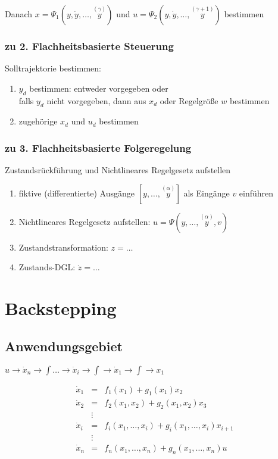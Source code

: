 \documentclass[6pt,a4paper,fleqn]{scrartcl}
\newcommand{\os}[2]{\ensuremath{\overset{#1}{#2}}}
\begin{document}
\begin{multicols*}{4}
Danach $x = \Psi_1 (y, \dot{y}, \dots, \os{(\gamma)}{y})$ und $u = \Psi_2 (y, \dot{y}, \dots, \os{(\gamma +1)}{y})$ bestimmen

\subsubsection*{zu 2. Flachheitsbasierte Steuerung}

Solltrajektorie bestimmen:
\begin{enumerate}
  \item $y_d$ bestimmen: entweder vorgegeben oder\\
    falls $y_d$ nicht vorgegeben, dann aus $x_d$ oder Regelgröße $w$ bestimmen
  \item zugehörige $x_d$ und $u_d$ bestimmen
\end{enumerate}

\subsubsection*{zu 3. Flachheitsbasierte Folgeregelung}
Zustandsrückführung und Nichtlineares Regelgesetz aufstellen
\begin{enumerate}
  \item fiktive (differentierte) Ausgänge $\left[ y, \dots, \os{(\alpha)}{y} \right]$ als Eingänge $v$ einführen
  \item Nichtlineares Regelgesetz aufstellen: $u = \Psi\left( y, \dots, \os{(\alpha)}{y}, v \right)$
  \item Zustandstransformation: $z = \dots$
  \item Zustands-DGL: $\dot{z} = \dots$
\end{enumerate}


\section{Backstepping}

\subsection{Anwendungsgebiet}
$u \rightarrow \dot{x}_n \rightarrow \int \dots \rightarrow \dot{x}_i \rightarrow \int \rightarrow \dot{x}_1 \rightarrow \int \rightarrow x_1$

\begin{align*}
  \dot{x}_1 &=      & f_1(x_1) + g_1(x_1)x_2 \\
  \dot{x}_2 &=      & f_2(x_1, x_2) + g_2(x_1, x_2)x_3 \\
            &\vdots & \\
  \dot{x}_i &=      & f_i(x_1, \dots, x_i) + g_i(x_1, \dots, x_i)x_{i+1} \\
            &\vdots & \\
  \dot{x}_n &=      & f_n(x_1, \dots, x_n) + g_n(x_1, \dots, x_n)u
\end{align*}



\end{multicols*}
\end{document}
